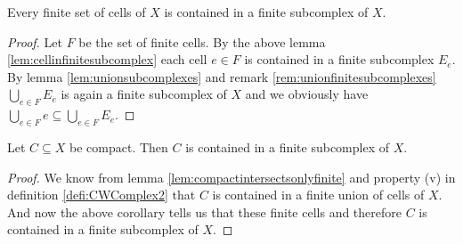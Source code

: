 \begin{cor}
    Every finite set of cells of $X$ is contained in a finite subcomplex of $X$.
\end{cor}
\begin{proof}
    Let $F$ be the set of finite cells. 
    By the above lemma \ref{lem:cellinfinitesubcomplex} each cell $e \in F$ is contained in a finite subcomplex $E_e$. 
    By lemma \ref{lem:unionsubcomplexes} and remark \ref{rem:unionfinitesubcomplexes} $\bigcup_{e \in F}E_e$ is again a finite subcomplex of $X$ and we obviously have $\bigcup_{e \in F} e \subseteq \bigcup_{e \in F}E_e$.
\end{proof}

\begin{cor}
    Let $C \subseteq X$ be compact. 
    Then $C$ is contained in a finite subcomplex of $X$.
\end{cor}
\begin{proof}
    We know from lemma \ref{lem:compactintersectsonlyfinite} and property (v) in definition \ref{defi:CWComplex2} that $C$ is contained in a finite union of cells of $X$. 
    And now the above corollary tells us that these finite cells and therefore $C$ is contained in a finite subcomplex of $X$.
\end{proof}